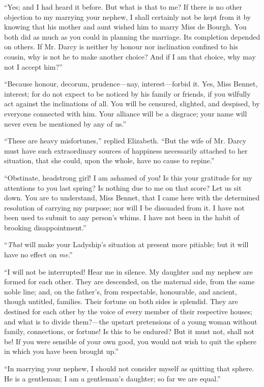 \documentclass[12pt,openright]{book}
\begin{document}
“Yes; and I had heard it before. But what is that to me? If there is no other objection to my marrying your nephew, I shall certainly not be kept from it by knowing that his mother and aunt wished him to marry Miss de Bourgh. You both did as much as you could in planning the marriage. Its completion depended on others. If Mr. Darcy is neither by honour nor inclination confined to his cousin, why is not he to make another choice? And if I am that choice, why may not I accept him?”

“Because honour, decorum, prudence—nay, interest—forbid it. Yes, Miss Bennet, interest; for do not expect to be noticed by his family or friends, if you wilfully act against the inclinations of all. You will be censured, slighted, and despised, by everyone connected with him. Your alliance will be a disgrace; your name will never even be mentioned by any of us.”

“These are heavy misfortunes,” replied Elizabeth. “But the wife of Mr. Darcy must have such extraordinary sources of happiness necessarily attached to her situation, that she could, upon the whole, have no cause to repine.”

“Obstinate, headstrong girl! I am ashamed of you! Is this your gratitude for my attentions to you last spring? Is nothing due to me on that score? Let us sit down. You are to understand, Miss Bennet, that I came here with the determined resolution of carrying my purpose; nor will I be dissuaded from it. I have not been used to submit to any person’s whims. I have not been in the habit of brooking disappointment.”

“\textit{That} will make your Ladyship’s situation at present more pitiable; but it will have no effect on \textit{me}.”

“I will not be interrupted! Hear me in silence. My daughter and my nephew are formed for each other. They are descended, on the maternal side, from the same noble line; and, on the father’s, from respectable, honourable, and ancient, though untitled, families. Their fortune on both sides is splendid. They are destined for each other by the voice of every member of their respective houses; and what is to divide them?—the upstart pretensions of a young woman without family, connections, or fortune! Is this to be endured? But it must not, shall not be! If you were sensible of your own good, you would not wish to quit the sphere in which you have been brought up.”

“In marrying your nephew, I should not consider myself as quitting that sphere. He is a gentleman; I am a gentleman’s daughter; so far we are equal.”
\end{document}
